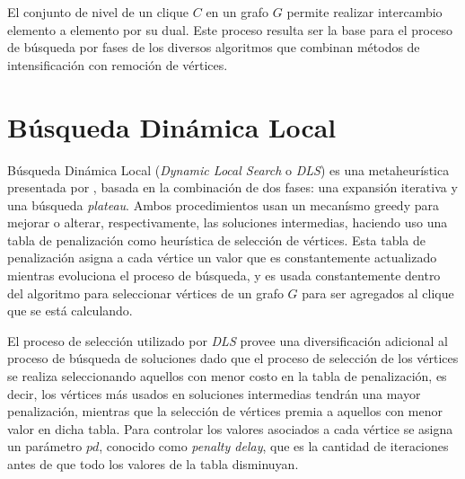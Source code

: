 \documentclass[conference]{IEEEtran}
\begin{document}
El conjunto de nivel de un clique $C$ en un grafo $G$ permite realizar
intercambio elemento a elemento por su dual. Este proceso resulta ser
la base para el proceso de búsqueda por fases de los diversos
algoritmos que combinan métodos de intensificación con remoción de
vértices.

\section{Búsqueda Dinámica Local}
\label{sec:dls}


Búsqueda Dinámica Local (\emph{Dynamic Local Search} o \emph{DLS}) es
una metaheurística presentada por \cite{dynamicl}, basada en la
combinación de dos fases: una expansión iterativa y una búsqueda
\emph{plateau}. Ambos procedimientos usan un mecanísmo greedy para
mejorar o alterar, respectivamente, las soluciones intermedias,
haciendo uso una tabla de penalización como heurística de selección de
vértices. Esta tabla de penalización asigna a cada vértice un valor
que es constantemente actualizado mientras evoluciona el proceso de
búsqueda, y  es usada constantemente dentro del algoritmo para
seleccionar vértices de un grafo $G$ para ser agregados al clique que
se está calculando.

El proceso de selección utilizado por \emph{DLS} provee una
diversificación adicional al proceso de búsqueda de soluciones dado
que el proceso de selección de los vértices se realiza seleccionando
aquellos con menor costo en la tabla de penalización, es decir, los
vértices más usados en soluciones intermedias tendrán una mayor
penalización, mientras que la selección de vértices premia a aquellos
con menor valor en dicha tabla. Para controlar los valores asociados a
cada vértice se asigna un parámetro $pd$, conocido como \emph{penalty
  delay}, que es la cantidad de iteraciones antes de que todo los
valores de la tabla disminuyan.
\end{document}
